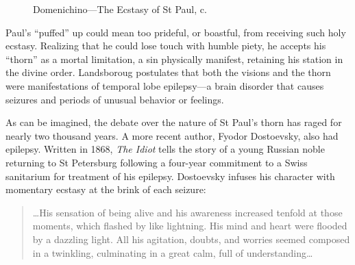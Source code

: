 \documentclass{UIdahoMastersThesis}
\begin{document}
\begin{figure}[h!]
	\centering
	{%
		\setlength{\fboxsep}{0pt}%
		\setlength{\fboxrule}{1.5pt}%
	}%
	\caption{Domenichino---The Ecstasy of St Paul,  c.}
	\label{fig:paul}
\end{figure}

Paul's ``puffed'' up could mean too prideful, or boastful, from receiving such holy ecstasy. Realizing that he could lose touch with humble piety, he accepts his ``thorn'' as a mortal limitation, a sin physically manifest, retaining his station in the divine order. Landsboroug postulates that both the visions and the thorn were manifestations of temporal lobe epilepsy---a brain disorder that causes seizures and periods of unusual behavior or feelings.

As can be imagined, the debate over the nature of St Paul's thorn has raged for nearly two thousand years. A more recent author, Fyodor Dostoevsky, also had epilepsy. Written in 1868, \emph{The Idiot} tells the story of a young Russian noble returning to St Petersburg following a four-year commitment to a Swiss sanitarium for treatment of his epilepsy. Dostoevsky infuses his character with momentary ecstasy at the brink of each seizure:

\begin{quote}
{\ldots His sensation of being alive and his awareness increased tenfold at those moments, which flashed by like lightning. His mind and heart were flooded by a dazzling light. All his agitation, doubts, and worries seemed composed in a twinkling, culminating in a great calm, full of understanding\ldots}\cite{bible_new_1984}
\end{quote}
\end{document}
